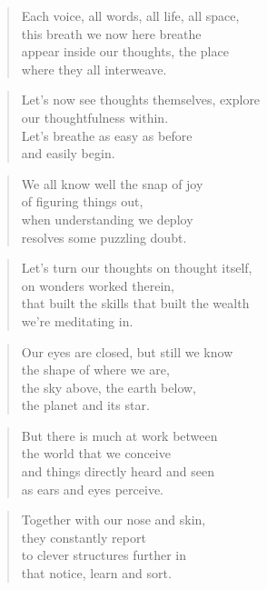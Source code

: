 \documentclass[10pt,a4paper]{article}
\begin{document}
\begin{paracol}{2}


\begin{verse}
Each voice, all words, all life, all space,\\
this breath we now here breathe\\
appear inside our thoughts, the place\\
where they all interweave.
\end{verse}

\begin{verse}
Let’s now see thoughts themselves, explore\\
our thoughtfulness within.\\
Let’s breathe as easy as before\\
and easily begin.
\end{verse}

\begin{verse}
We all know well the snap of joy\\
of figuring things out,\\
when understanding we deploy\\
resolves some puzzling doubt.
\end{verse}

\begin{verse}
Let’s turn our thoughts on thought itself,\\
on wonders worked therein,\\
that built the skills that built the wealth\\
we’re meditating in.
\end{verse}

\begin{verse}
Our eyes are closed, but still we know\\
the shape of where we are,\\
the sky above, the earth below,\\
the planet and its star.
\end{verse}

\begin{verse}
But there is much at work between\\
the world that we conceive\\
and things directly heard and seen\\
as ears and eyes perceive.
\end{verse}

\begin{verse}
Together with our nose and skin,\\
they constantly report\\
to clever structures further in\\
that notice, learn and sort.
\end{verse}


\end{paracol}
\end{document}
